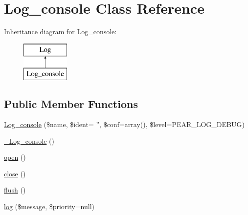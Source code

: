 \hypertarget{class_log__console}{
\section{Log\_\-console Class Reference}
\label{class_log__console}
}
Inheritance diagram for Log\_\-console:\begin{figure}[H]
\begin{center}
\leavevmode
\includegraphics[height=2.000000cm]{class_log__console}
\end{center}
\end{figure}
\subsection*{Public Member Functions}
\begin{DoxyCompactItemize}
\item 
\hyperlink{class_log__console_aaa9a2855c18816bd8d7ccb8148487c0e}{Log\_\-console} (\$name, \$ident= '', \$conf=array(), \$level=PEAR\_\-LOG\_\-DEBUG)
\item 
\hyperlink{class_log__console_abc58ff1264a1428e0f5b6c67a2432796}{\_\-Log\_\-console} ()
\item 
\hyperlink{class_log__console_a44a2ac59a3b91f8c18905dce700934d6}{open} ()
\item 
\hyperlink{class_log__console_aa69c8bf1f1dcf4e72552efff1fe3e87e}{close} ()
\item 
\hyperlink{class_log__console_a7751f77b5263bcf940ece6e824a05b38}{flush} ()
\item 
\hyperlink{class_log__console_ac3758dfa38a67df158a446847cf06413}{log} (\$message, \$priority=null)
\end{DoxyCompactItemize}
